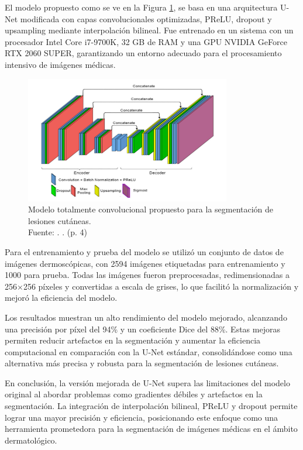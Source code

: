 El modelo propuesto como se ve en la Figura \ref{2:fig6}, se basa en una arquitectura U-Net modificada con capas convolucionales optimizadas, PReLU, dropout y upsampling mediante interpolación bilineal. Fue entrenado en un sistema con un procesador Intel Core i7-9700K, 32 GB de RAM y una GPU NVIDIA GeForce RTX 2060 SUPER, garantizando un entorno adecuado para el procesamiento intensivo de imágenes médicas.

\begin{figure}[!ht]
	\begin{center}
		\includegraphics[width=0.80\textwidth]{2/figures/segmentation1.png}
		\caption[Modelo totalmente convolucional propuesto para la segmentación de lesiones cutáneas]{Modelo totalmente convolucional propuesto para la segmentación de lesiones cutáneas.\\
			Fuente: \cite{karshiev2020improved}. . (p. 4)}
		\label{2:fig6}
	\end{center}
\end{figure}

Para el entrenamiento y prueba del modelo se utilizó un conjunto de datos de imágenes dermoscópicas, con 2594 imágenes etiquetadas para entrenamiento y 1000 para prueba. Todas las imágenes fueron preprocesadas, redimensionadas a 256×256 píxeles y convertidas a escala de grises, lo que facilitó la normalización y mejoró la eficiencia del modelo.

Los resultados muestran un alto rendimiento del modelo mejorado, alcanzando una precisión por píxel del 94\% y un coeficiente Dice del 88\%. Estas mejoras permiten reducir artefactos en la segmentación y aumentar la eficiencia computacional en comparación con la U-Net estándar, consolidándose como una alternativa más precisa y robusta para la segmentación de lesiones cutáneas.

En conclusión, la versión mejorada de U-Net supera las limitaciones del modelo original al abordar problemas como gradientes débiles y artefactos en la segmentación. La integración de interpolación bilineal, PReLU y dropout permite lograr una mayor precisión y eficiencia, posicionando este enfoque como una herramienta prometedora para la segmentación de imágenes médicas en el ámbito dermatológico.





